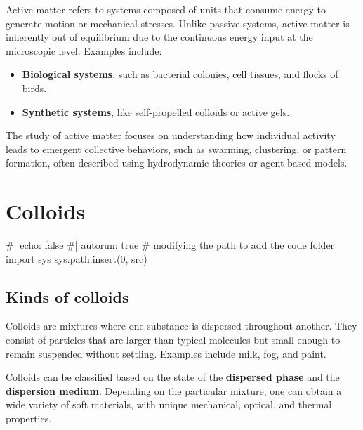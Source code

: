 \documentclass[
  letterpaper,
  enabledeprecatedfontcommands]{report}
\newenvironment{Shaded}{\begin{snugshade}}{\end{snugshade}}
\newcommand{\NormalTok}[1]{\textcolor[rgb]{0.00,0.23,0.31}{#1}}
\providecommand{\tightlist}{%
  \setlength{\itemsep}{0pt}\setlength{\parskip}{0pt}}
\begin{document}
Active matter refers to systems composed of units that consume energy to
generate motion or mechanical stresses. Unlike passive systems, active
matter is inherently out of equilibrium due to the continuous energy
input at the microscopic level. Examples include:

\begin{itemize}
\tightlist
\item
  \textbf{Biological systems}, such as bacterial colonies, cell tissues,
  and flocks of birds.
\item
  \textbf{Synthetic systems}, like self-propelled colloids or active
  gels.
\end{itemize}

The study of active matter focuses on understanding how individual
activity leads to emergent collective behaviors, such as swarming,
clustering, or pattern formation, often described using hydrodynamic
theories or agent-based models.

\chapter{Colloids}\label{colloids-1}

\begin{Shaded}
\begin{Highlighting}[]
\NormalTok{\#| echo: false}
\NormalTok{\#| autorun: true}
\NormalTok{\# modifying the path to add the code folder}
\NormalTok{import sys}
\NormalTok{sys.path.insert(0, \textquotesingle{}src\textquotesingle{})}
\end{Highlighting}
\end{Shaded}

\section{Kinds of colloids}\label{kinds-of-colloids}

Colloids are mixtures where one substance is dispersed throughout
another. They consist of particles that are larger than typical
molecules but small enough to remain suspended without settling.
Examples include milk, fog, and paint.

Colloids can be classified based on the state of the \textbf{dispersed
phase} and the \textbf{dispersion medium}. Depending on the particular
mixture, one can obtain a wide variety of soft materials, with unique
mechanical, optical, and thermal properties.
\end{document}
